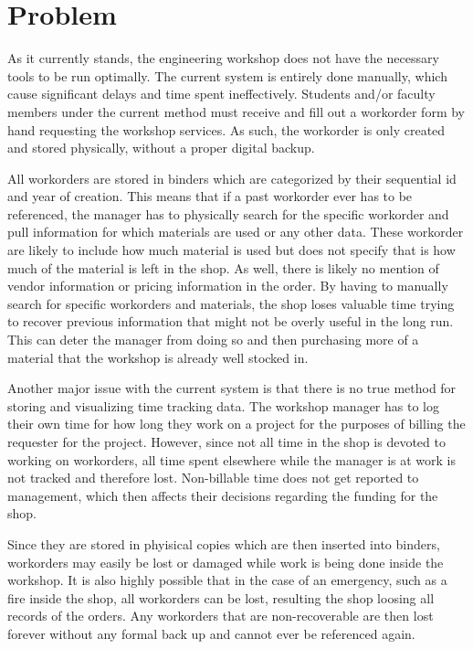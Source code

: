 \section{Problem}
As it currently stands, the engineering workshop does not have the necessary tools to be run optimally. The current system is entirely done manually, which cause significant delays and time spent ineffectively. Students and/or faculty members under the current method must receive and fill out a workorder form by hand requesting the workshop services. As such, the workorder is only created and stored physically, without a proper digital backup.
\newline
{\setlength{\parindent}{0cm}

All workorders are stored in binders which are categorized by their sequential id and year of creation. This means that if a past workorder ever has to be referenced, the manager has to physically search for the specific workorder and pull information for which materials are used or any other data. These workorder are likely to include how much material is used but does not specify that is how much of the material is left in the shop. As well, there is likely no mention of vendor information or pricing information in the order. 
By having to manually search for specific workorders and materials, the shop loses valuable time trying to recover previous information that might not be overly useful in the long run. This can deter the manager from doing so and then purchasing more of a material that the workshop is already well stocked in. 
\newline
{\setlength{\parindent}{0cm}

Another major issue with the current system is that there is no true method for storing and visualizing time tracking data. The workshop manager has to log their own time for how long they work on a project for the purposes of billing the requester for the project. However, since not all time in the shop is devoted to working on workorders, all time spent elsewhere while the manager is at work is not tracked and therefore lost. Non-billable time does not get reported to management, which then affects their decisions regarding the funding for the shop.
\newline
{\setlength{\parindent}{0cm}

Since they are stored in phyisical copies which are then inserted into binders, workorders may easily be lost or damaged while work is being done inside the workshop. It is also highly possible that in the case of an emergency, such as a fire inside the shop, all workorders can be lost, resulting the shop loosing all records of the orders. Any workorders that are non-recoverable are then lost forever without any formal back up and cannot ever be referenced again.  

}}}
